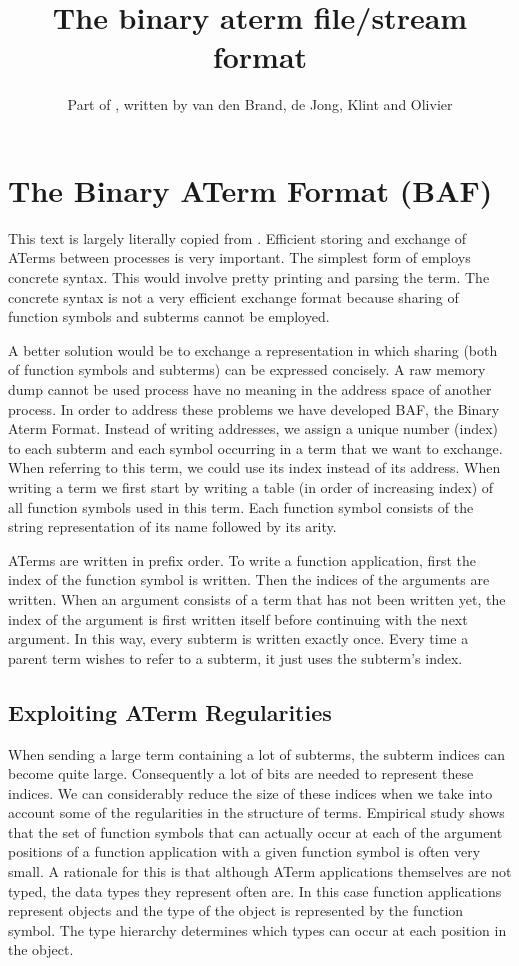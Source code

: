 \documentclass{article}
\title{The binary aterm file/stream format}
\author{Part of \cite{BJKO99}, written by van den Brand, de Jong, Klint and Olivier}
\date{}
\begin{document}
\maketitle
\section{The Binary ATerm Format (BAF)}
This text is largely literally copied from \cite{BJKO99}.
Efficient storing and exchange of ATerms between processes is very important.  
The simplest form of employs concrete syntax.
This would involve pretty printing and parsing the term.  
The concrete syntax is not a very efficient exchange format because sharing of function symbols and 
subterms cannot be employed.

A better solution would be to exchange a representation in which sharing (both of function symbols and subterms) 
can be expressed concisely. 
A raw memory dump cannot be used  process have no meaning in the address space of another process.
In order to address these problems we have developed BAF, the Binary Aterm Format. Instead of writing addresses, we assign a unique number
(index) to each subterm and each symbol occurring in a term that we want to exchange.  
When referring to this term, we could use its index instead of its address.
When writing a term  we first start by writing a table 
(in order of increasing index) of all function symbols used in this term. 
Each function symbol consists of the string representation of its name followed by its arity.

ATerms are written in prefix order. To write a function application, first the index of the function symbol
is written. Then the indices of the arguments are written. When an argument consists of a term that has not been 
written yet, the index of the argument is first written itself before continuing with the next argument. In this way,
every subterm is written exactly once. Every time a parent term wishes to refer to a subterm, it just 
uses the subterm's index.

\subsection{Exploiting ATerm Regularities}
When sending a large term containing a lot of subterms, the subterm indices can become quite large. 
Consequently a lot of bits are needed to represent these indices. 
We can considerably reduce the size of these indices when we take into account some of the regularities in the 
structure of terms. Empirical study shows that the set of function symbols that can actually occur at each 
of the argument positions of a function application with a given function symbol is often very small. 
A rationale for this is that although ATerm applications themselves are not typed, 
the data types they represent often are. 
In this case  function applications represent objects and the type of the object is represented 
by the function symbol. The type hierarchy determines which types can occur at each position in the object.
\end{document}
